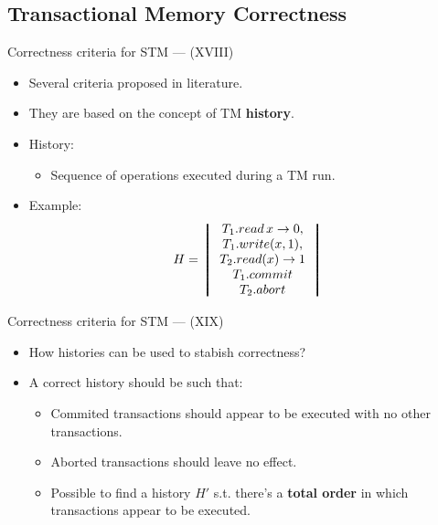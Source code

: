 \documentclass[14pt]{beamer}
\begin{document}
     \subsection{Transactional Memory Correctness}
     \begin{frame}{Correctness criteria for STM --- (XVIII)}
        \begin{itemize}
           \item Several criteria proposed in literature.
           \item They are based on the concept of TM \textbf{history}.
           \item History:
           \begin{itemize}
              \item Sequence of operations executed during a TM run.
           \end{itemize}
           \item Example:
\[H =\left\bracevert \begin{array}{c}
                 T_1.read\,x \to 0, \\
                 T_1.write(x,1), \\
                 T_2.read(x)\to 1 \\
                 T_1.commit \\
                 T_2.abort\end{array}\right\bracevert\]
        \end{itemize}
     \end{frame}
     \begin{frame}{Correctness criteria for STM --- (XIX)}
        \begin{itemize}
           \item How histories can be used to stabish correctness?
           \item A correct history should be such that:
           \begin{itemize}
              \item Commited transactions should appear to be executed with
                    no other transactions.
              \item Aborted transactions should leave no effect.
              \item Possible to find a history $H'$ s.t. there's
              a \textbf{total order} in which transactions appear to be executed.
           \end{itemize}
        \end{itemize}
     \end{frame}
\end{document}
